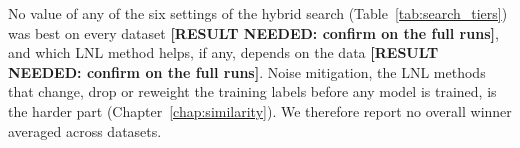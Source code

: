 
No value of any of the six settings of the hybrid search (Table~\ref{tab:search_tiers}) was best on every dataset \textbf{[RESULT NEEDED: confirm on the full runs]}, and which LNL method helps, if any, depends on the data \textbf{[RESULT NEEDED: confirm on the full runs]}. Noise mitigation, the LNL methods that change, drop or reweight the training labels before any model is trained, is the harder part (Chapter~\ref{chap:similarity}). We therefore report no overall winner averaged across datasets.

